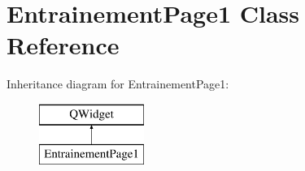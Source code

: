 \section{Entrainement\-Page1 Class Reference}
\label{class_entrainement_page1}
Inheritance diagram for Entrainement\-Page1\-:\begin{figure}[H]
\begin{center}
\leavevmode
\includegraphics[height=2.000000cm]{class_entrainement_page1}
\end{center}
\end{figure}
